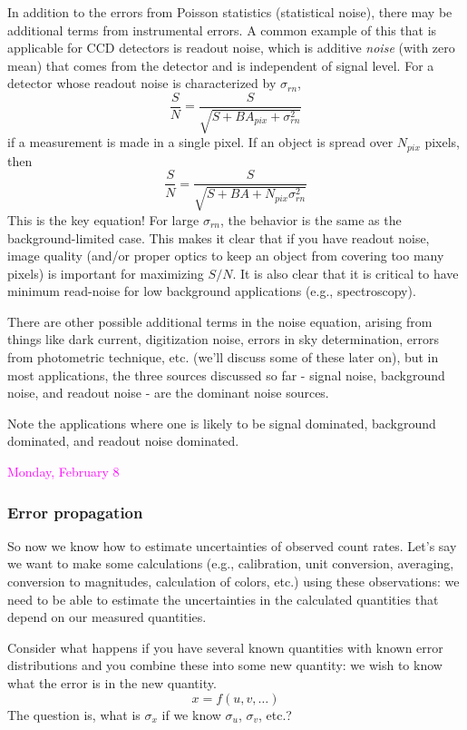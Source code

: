 \documentclass[12pt]{article}
\begin{document}
In addition to the errors from Poisson statistics (statistical noise),
there may be additional terms from instrumental errors. A common
example of this that is applicable for CCD detectors is readout noise,
which is additive \emph{noise} (with zero mean) that comes from the detector
and is independent of signal level. For a detector whose readout noise
is characterized by $\sigma_{rn}$,
$$ \frac{S}{N} = \frac{S}{\sqrt{S+BA_{pix}+\sigma^2_{rn}}} $$
if a measurement is made in a single pixel. If an object is spread
over $N_{pix}$ pixels, then
$$ \boxed{
 \frac{S}{N} = \frac{S}{\sqrt{S+BA+N_{pix}\sigma^2_{rn}}}
 } $$
\textcolor{myBlue}{This is the key equation!}
For large $\sigma_{rn}$, the behavior is the same as the
background-limited case. This makes it clear that if you have readout
noise, image quality (and/or proper optics to keep an object from
covering too many pixels) is important for maximizing $S/N$. It is
also clear that it is critical to have minimum read-noise for low
background applications (e.g., spectroscopy).

There are other possible additional terms in the noise equation,
arising from things like dark current, digitization noise, errors in
sky determination, errors from photometric technique, etc. (we'll
discuss some of these later on), but in most applications, the three
sources discussed so far - signal noise, background noise, and readout
noise - are the dominant noise sources.

Note the applications where one is likely to be signal dominated,
background dominated, and readout noise dominated.

\textcolor{magenta}{Monday, February 8}

\subsubsection*{Error propagation}

So now we know how to estimate uncertainties of observed count rates.
Let's say we want to make some calculations (e.g., calibration, unit
conversion, averaging, conversion to magnitudes, calculation of
colors, etc.) using these observations: we need to be able to estimate
the uncertainties in the calculated quantities that depend on our
measured quantities.

Consider what happens if you have several known quantities with known
error distributions and you combine these into some new quantity: we
wish to know what the error is in the new quantity.
    $$ x = f(u, v, \ldots) $$
The question is, what is $\sigma_x$ if we know 
$\sigma_u$, $\sigma_v$, etc.?
\end{document}
